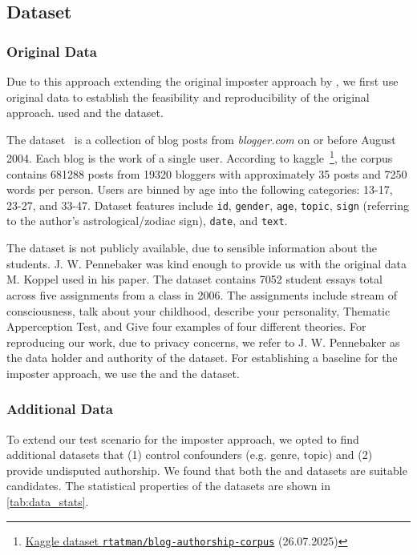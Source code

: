 \subsection{Dataset}
\label{subsec:dataset}

\subsubsection{Original Data}
Due to this approach extending the original imposter approach by \citet{koppel_determining_2014}, 
we first use original data to establish the feasibility and reproducibility of the original approach. 
\citet{koppel_determining_2014} used \dataBlog{} and the \dataStudent{} dataset.

The \dataBlog{} dataset~\citep{blog_dataset_2006} is a collection of blog posts from \textit{blogger.com} on or before August 2004.
Each blog is the work of a single user.
According to kaggle~\footnote{\href{https://www.kaggle.com/datasets/rtatman/blog-authorship-corpus?resource=download}{Kaggle dataset \texttt{rtatman/blog-authorship-corpus}} (26.07.2025)},
the corpus contains \num{681288} posts from \num{19320} bloggers with approximately 35 posts and \num{7250} words per person.
Users are binned by age into the following categories: 13-17, 23-27, and 33-47.
Dataset features include \texttt{id}, \texttt{gender}, \texttt{age}, \texttt{topic}, 
\texttt{sign} (referring to the author's astrological/zodiac sign), \texttt{date}, and \texttt{text}.

The  \dataStudent{} dataset is not publicly available, due to sensible information about the students.
J. W. Pennebaker was kind enough to provide us with the original data M. Koppel used in his paper.
The dataset contains \num{7052} student essays total across five assignments from a class in 2006.
The assignments include stream of consciousness, talk about your childhood, describe your personality, 
Thematic Apperception Test, and Give four examples of four different theories.
For reproducing our work, due to privacy concerns, 
we refer to J. W. Pennebaker as the data holder and authority of the \dataStudent{} dataset.
For establishing a baseline for the imposter approach, we use the \dataBlog{} and the \dataStudent{} dataset.

\subsubsection{Additional Data}
To extend our test scenario for the imposter approach, we opted to find additional datasets that 
(1) control confounders (e.g. genre, topic) and (2) provide undisputed authorship.
We found that both the \dataPan{} and \dataGutenberg{} datasets are suitable candidates.
The statistical properties of the datasets are shown in \autoref{tab:data_stats}.

